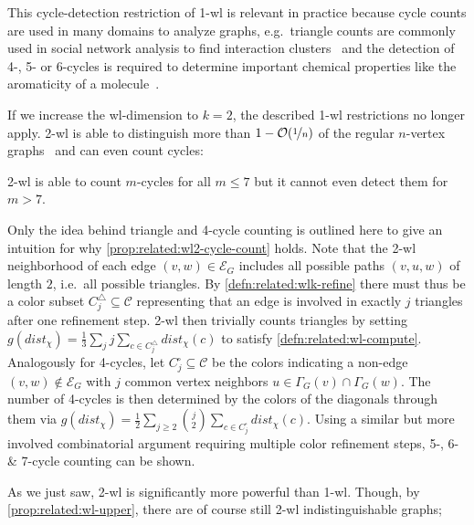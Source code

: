 This cycle-detection restriction of 1-\acs{wl} is relevant in practice because cycle counts are used in many domains to analyze graphs, e.g.\ triangle counts are commonly used in social network analysis to find interaction clusters~\cite{Milo2002}\cite{Newman2003}\cite{Welser2007} and the detection of 4-, 5- or 6-cycles is required to determine important chemical properties like the aromaticity of a molecule~\cite{Adamson1973}\cite{Kekule1866}.

If we increase the \acs{wl}-dimension to $k = 2$, the described 1-\acs{wl} restrictions no longer apply.
2-\acs{wl} is able to distinguish more than $1 - \mathcal{O}(\nicefrac{1}{n})$ of the regular $n$-vertex graphs~\cite[cor.~1.8.6]{Immerman1990} and can even count cycles:
\begin{prop}\label{prop:related:wl2-cycle-count}
	2-\acs{wl} is able to count $m$-cycles for all $m \leq 7$ but it cannot even detect them for $m > 7$.
\end{prop}
\begin{hproof}
	Only the idea behind triangle and 4-cycle counting is outlined here to give an intuition for why \cref{prop:related:wl2-cycle-count} holds.
	Note that the 2-\acs{wl} neighborhood of each edge $(v, w) \in \mathcal{E}_G$ includes all possible paths $(v, u, w)$ of length $2$, i.e.\ all possible triangles.
	By \cref{defn:related:wlk-refine} there must thus be a color subset $C^{\triangle}_j \subseteq \mathcal{C}$ representing that an edge is involved in exactly $j$ triangles after one refinement step.
	2-\acs{wl} then trivially counts triangles by setting $g(\mathit{dist}_\chi) = \frac{1}{3} \sum_j j \sum_{c \in C^{\triangle}_j} \mathit{dist}_\chi(c)$ to satisfy \cref{defn:related:wl-compute}.
	Analogously for 4-cycles, let $C^{\square}_j \subseteq \mathcal{C}$ be the colors indicating a non-edge $(v, w) \notin \mathcal{E}_G$ with $j$ common vertex neighbors $u \in \Gamma_G(v) \cap \Gamma_G(w)$.
	The number of 4-cycles is then determined by the colors of the diagonals through them via $g(\mathit{dist}_\chi) = \frac{1}{2} \sum_{j \geq 2} \binom{j}{2} \sum_{c \in C^{\square}_j} \mathit{dist}_\chi(c)$.
	Using a similar but more involved combinatorial argument requiring multiple color refinement steps, 5-, 6- \& 7-cycle counting can be shown.
\end{hproof}
As we just saw, 2-\acs{wl} is significantly more powerful than 1-\acs{wl}.
Though, by \cref{prop:related:wl-upper}, there are of course still 2-\acs{wl} indistinguishable graphs;
